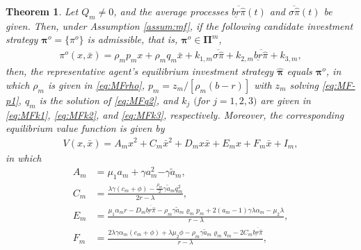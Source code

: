 \documentclass[11pt]{article}
\newtheorem{theorem}{Theorem}[section]
\numberwithin{equation}{section}
\newcommand{\bpi}{\boldsymbol{\pi}}
\begin{document}
\begin{theorem}
Let \(Q_{\scriptscriptstyle m}\neq 0\), and the average processes \(\overline{\underline{br}\widehat{\pi}}(t)\) and  \(\overline{\sigma\widehat{\pi}}(t)\) be given. Then, under Assumption \ref{assum:mf}, if the following candidate investment strategy ${\bpi^o} = \{{\pi^o}\}$ is admissible, that is, ${\bpi^o} \in \boldsymbol{\Pi}^m$,
\begin{align}\label{eq:M-pi_i}
{\pi^o}(x, \bar{x}) = \rho_{\scriptscriptstyle m} p_{\scriptscriptstyle m} x + \rho_{\scriptscriptstyle m} q_{\scriptscriptstyle m} \bar{x} + k_{1,m} \overline{\sigma\widehat{\pi}} + k_{2,m}\overline{\underline{br}\widehat{\pi}}+k_{3,m},
\end{align}
then, the representative agent's equilibrium investment strategy \(\widehat{\bpi}\) equals ${\bpi^o}$,
in which \(\rho_{\scriptscriptstyle m}\) is given in \eqref{eq:MFrho},  \(p_{\scriptscriptstyle m}=z_{\scriptscriptstyle m}/[\rho_{\scriptscriptstyle m}(b-r)]\) with \(z_{\scriptscriptstyle m}\) solving  \eqref{eq:MF-p1}, \(q_{\scriptscriptstyle m}\) is the solution of \eqref{eq:MFq2}, and
			\(k_j\) $($for \(j=1,2,3\)$)$ are given in \eqref{eq:MFk1}, \eqref{eq:MFk2}, and \eqref{eq:MFk3}, respectively.
			Moreover, the corresponding equilibrium value function is given by
			\begin{align}\label{eq:MF-VV}
				V(x,\bar{x})=A_{\scriptscriptstyle m} x^2+C_{\scriptscriptstyle m} \bar{x}^2+D_{\scriptscriptstyle m} x\bar{x}+E_{\scriptscriptstyle m} x+F_{\scriptscriptstyle m} \bar{x}+I_{\scriptscriptstyle m},
			\end{align}
			in which
			\begin{align}
				A_{\scriptscriptstyle m}&=\mu_1 a_{\scriptscriptstyle m}+\gamma {a^2_{\scriptscriptstyle m}}{-\gamma  \tilde{a}_{\scriptscriptstyle m},}\\
				C_{\scriptscriptstyle m}&=\frac{\lambda\gamma(c_{\scriptscriptstyle m}+\phi)-\frac{\rho_{\scriptscriptstyle m}}{2}\gamma \tilde{a}_{\scriptscriptstyle m}{q^2_{\scriptscriptstyle m}}}{2r-\lambda},\\
				E_{\scriptscriptstyle m}&=\frac{\mu_1\alpha_{\scriptscriptstyle m}r-D_{\scriptscriptstyle m}\overline{\underline{br}\widehat{\pi}}-\rho_{\scriptscriptstyle m}\gamma  \tilde{a}_{\scriptscriptstyle m}\varrho_{\scriptscriptstyle m}p_{\scriptscriptstyle m}+2(a_{\scriptscriptstyle m}-1)\gamma\lambda \alpha_{\scriptscriptstyle m}-\mu_2\lambda}{r-\lambda},\\
				F_{\scriptscriptstyle m}&=\frac{2\lambda\gamma \alpha_{\scriptscriptstyle m}(c_{\scriptscriptstyle m}+\phi)+\lambda\mu_2\phi-\rho_{\scriptscriptstyle m}\gamma \tilde{a}_{\scriptscriptstyle m}\varrho_{\scriptscriptstyle m}q_{\scriptscriptstyle m}-2C_{\scriptscriptstyle m}\overline{\underline{br}\widehat{\pi}}}{r-\lambda},\\

\end{align}
\end{theorem}
\end{document}

